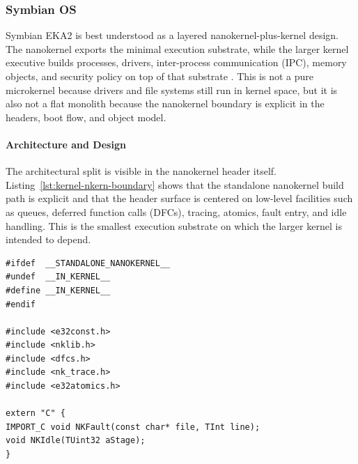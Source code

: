 \subsubsection{Symbian OS}


Symbian EKA2 is best understood as a layered nanokernel-plus-kernel design.
The nanokernel exports the minimal execution substrate, while the larger kernel
executive builds processes, drivers, inter-process communication (IPC), memory
objects, and security policy on top of that substrate
\citep{sales2005, symbian_eka2_kernel}. This is not a pure microkernel because
drivers and file systems still run in kernel space, but it is also not a flat
monolith because the nanokernel boundary is explicit in the headers, boot
flow, and object model.

\paragraph{Architecture and Design}

The architectural split is visible in the nanokernel header itself.
Listing~\ref{lst:kernel-nkern-boundary} shows that the standalone nanokernel
build path is explicit and that the header surface is centered on low-level
facilities such as queues, deferred function calls (DFCs), tracing, atomics,
fault entry, and idle handling. This is the smallest execution substrate on
which the larger kernel is intended to depend.

\begin{listing}[H]
\begin{verbatim}
#ifdef	__STANDALONE_NANOKERNEL__
#undef	__IN_KERNEL__
#define	__IN_KERNEL__
#endif

#include <e32const.h>
#include <nklib.h>
#include <dfcs.h>
#include <nk_trace.h>
#include <e32atomics.h>

extern "C" {
IMPORT_C void NKFault(const char* file, TInt line);
void NKIdle(TUint32 aStage);
}
\end{verbatim}
\caption{Standalone nanokernel boundary and low-level surface. File:
\texttt{nkern.h}.}
\label{lst:kernel-nkern-boundary}
\end{listing}

